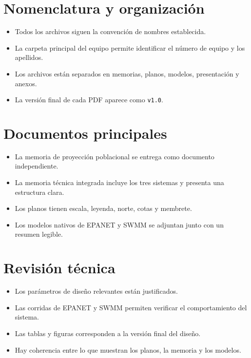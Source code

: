 \documentclass[11pt]{article}
\begin{document}

\section{Nomenclatura y organizaci\'on}
\begin{itemize}
\item Todos los archivos siguen la convenci\'on de nombres establecida.
\item La carpeta principal del equipo permite identificar el n\'umero de equipo y los apellidos.
\item Los archivos est\'an separados en memorias, planos, modelos, presentaci\'on y anexos.
\item La versi\'on final de cada PDF aparece como \texttt{v1.0}.
\end{itemize}

\section{Documentos principales}
\begin{itemize}
\item La memoria de proyecci\'on poblacional se entrega como documento independiente.
\item La memoria t\'ecnica integrada incluye los tres sistemas y presenta una estructura clara.
\item Los planos tienen escala, leyenda, norte, cotas y membrete.
\item Los modelos nativos de EPANET y SWMM se adjuntan junto con un resumen legible.
\end{itemize}

\section{Revisi\'on t\'ecnica}
\begin{itemize}
\item Los par\'ametros de dise\~no relevantes est\'an justificados.
\item Las corridas de EPANET y SWMM permiten verificar el comportamiento del sistema.
\item Las tablas y figuras corresponden a la versi\'on final del dise\~no.
\item Hay coherencia entre lo que muestran los planos, la memoria y los modelos.
\end{itemize}
\end{document}
